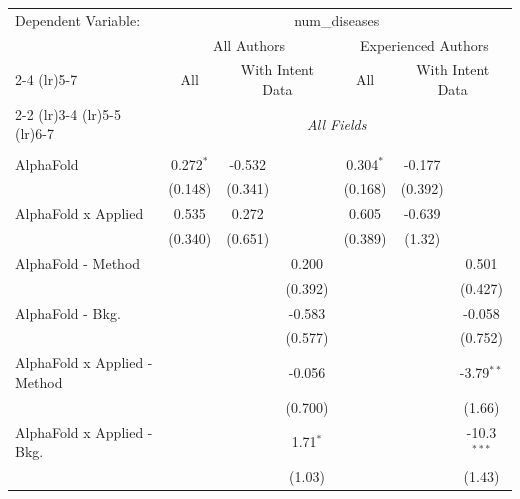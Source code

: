 \begingroup
\centering
\begin{tabular}{lcccccc}
   \tabularnewline \midrule \midrule
   Dependent Variable: & \multicolumn{6}{c}{num\_diseases}\\
 & \multicolumn{3}{c}{All Authors} & \multicolumn{3}{c}{Experienced Authors} \\
\cmidrule(lr){2-4} \cmidrule(lr){5-7}
 & \multicolumn{1}{c}{All} & \multicolumn{2}{c}{With Intent Data} & \multicolumn{1}{c}{All} & \multicolumn{2}{c}{With Intent Data} \\
\cmidrule(lr){2-2} \cmidrule(lr){3-4} \cmidrule(lr){5-5} \cmidrule(lr){6-7}
 & \multicolumn{6}{c}{\textit{All Fields}} \\ \\
   AlphaFold                      & 0.272$^{*}$    & -0.532      &               & 0.304$^{*}$    & -0.177       &   \\   
                                  & (0.148)        & (0.341)     &               & (0.168)        & (0.392)      &   \\   
   AlphaFold x Applied            & 0.535          & 0.272       &               & 0.605          & -0.639       &   \\   
                                  & (0.340)        & (0.651)     &               & (0.389)        & (1.32)       &   \\   
   AlphaFold - Method             &                &             & 0.200         &                &              & 0.501\\   
                                  &                &             & (0.392)       &                &              & (0.427)\\   
   AlphaFold - Bkg.               &                &             & -0.583        &                &              & -0.058\\   
                                  &                &             & (0.577)       &                &              & (0.752)\\   
   AlphaFold x Applied - Method   &                &             & -0.056        &                &              & -3.79$^{**}$\\   
                                  &                &             & (0.700)       &                &              & (1.66)\\   
   AlphaFold x Applied - Bkg.     &                &             & 1.71$^{*}$    &                &              & -10.3$^{***}$\\   
                                  &                &             & (1.03)        &                &              & (1.43)\\   

\end{tabular}
